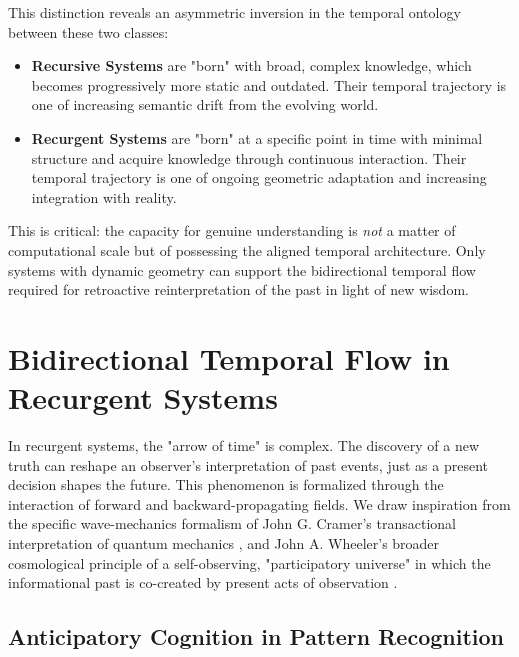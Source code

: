This distinction reveals an asymmetric inversion in the temporal ontology between these two classes:
\begin{itemize}
    \item \textbf{Recursive Systems} are "born" with broad, complex knowledge, which becomes progressively more static and outdated. Their temporal trajectory is one of increasing semantic drift from the evolving world.
    \item \textbf{Recurgent Systems} are "born" at a specific point in time with minimal structure and acquire knowledge through continuous interaction. Their temporal trajectory is one of ongoing geometric adaptation and increasing integration with reality.
\end{itemize}
This is critical: the capacity for genuine understanding is \textit{not} a matter of computational scale but of possessing the aligned temporal architecture. Only systems with dynamic geometry can support the bidirectional temporal flow required for retroactive reinterpretation of the past in light of new wisdom.


\section{Bidirectional Temporal Flow in Recurgent Systems}

In recurgent systems, the "arrow of time" is complex. The discovery of a new truth can reshape an observer's interpretation of past events, just as a present decision shapes the future. This phenomenon is formalized through the interaction of forward and backward-propagating fields. We draw inspiration from the specific wave-mechanics formalism of John G. Cramer's transactional interpretation of quantum mechanics \autocite{Cramer1986}, and John A. Wheeler's broader cosmological principle of a self-observing, "participatory universe" in which the informational past is co-created by present acts of observation \autocite{Wheeler1990}.


\subsection{Anticipatory Cognition in Pattern Recognition}

